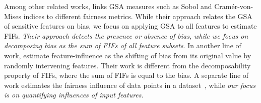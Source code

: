 
Among other related works, \cite{benesse2021fairness} links GSA measures such as Sobol and Cram{\'e}r-von-Mises indices to different fairness metrics. While their approach relates the GSA of sensitive features on bias, we focus on applying GSA to all features to estimate FIFs. \textit{Their approach detects the presence or absence of bias, while we focus on decomposing bias as the sum of FIFs of all feature subsets}. In another line of work, \cite{datta2016algorithmic}  estimate feature-influence as the shifting of bias from its original value by randomly intervening features. Their work is different from the decomposability property of FIFs, where the sum of FIFs is equal to the bias. A separate line of work estimates the fairness influence of data points in a dataset~\cite{li2022achieving,wang2022understanding}, while \textit{our focus is on quantifying influences of input features}.
